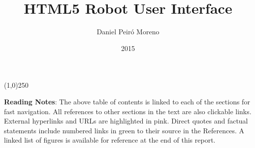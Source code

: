 \documentclass[12pt,twoside,a4paper]{report}
\title{HTML5 Robot User Interface}
\author{Daniel Peiró Moreno}
\date{2015}
\begin{document}
\maketitle



\tableofcontents
\begin{center}
\line(1,0){250}
\end{center}
\textbf{Reading Notes}: The above table of contents is linked to each of the sections for fast navigation. All references
to other sections in the text are also clickable links. External hyperlinks and URLs are highlighted in pink. Direct quotes
and factual statements include numbered links in green to their source in the References. A linked list of figures is
available for reference at the end of this report.


















\listoffigures
\printindex
\end{document}
